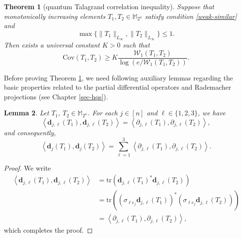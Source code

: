 \documentclass{amsbook}
\newtheorem{theorem}{Theorem}[chapter]
\newtheorem{lemma}[theorem]{Lemma}
\theoremstyle{definition}
\theoremstyle{remark}
\numberwithin{section}{chapter}
\numberwithin{equation}{chapter}
\newcommand{\M}{\mathbb{M}}
\newcommand{\1}{\mathbf{1}}
\newcommand{\dc}{\mathbf{d}}
\begin{document}
\begin{theorem}[quantum Talagrand correlation inequality]\label{quantum-ta}
 Suppose that monotonically increasing elements $T_1,T_2\in \M_{2^{n}}$ satisfy condition \eqref{weak-similar} and $$\max\{\|T_1\|_{L_{\infty}},\|T_2\|_{L_{\infty}}\}\leq 1.$$ Then exists a universal constant $K>0$ such that 
	\begin{equation}
		\mathrm{Cov}(T_1,T_2)\geq K\frac{\mathcal{W}_{1}(T_1,T_2)}{\log\left(e/\mathcal{W}_{1}(T_1,T_2)\right)}.
	\end{equation}
\end{theorem}



Before proving Theorem \ref{quantum-ta}, we need following auxiliary lemmas regarding the basic properties related to the partial differential operators and Rademacher projections (see Chapter \ref{sec-hqs}).

\begin{lemma}\label{monotone-lemma-1}
	Let $T_1$, $T_2\in \M_{2^{n}}$. For each $j\in [n]$ and $\ell\in\{1,2,3\}$, we have
	\begin{equation*}
		\left\langle \dc_{j,\ell}(T_1),\dc_{j,\ell}(T_2)\right\rangle=\left\langle\partial_{j,\ell}(T_1),\partial_{j,\ell}(T_2)\right\rangle,
	\end{equation*}
and consequently,
	\begin{equation}\label{transfer}
		\left\langle \dc_{j}(T_1),\dc_{j}(T_2)\right\rangle=\sum_{\ell=1}^3\left\langle\partial_{j,\ell}(T_1),\partial_{j,\ell}(T_2)\right\rangle.
	\end{equation}
\end{lemma}

\begin{proof}
We write
	\begin{align*}
		\left\langle \dc_{j,\ell}(T_1),\dc_{j,\ell}(T_2)\right\rangle&=\mathrm{tr}\left(\dc_{j,\ell}(T_1)^{*}\dc_{j,\ell}(T_2)\right)\\
		&=\mathrm{tr}\left(\left(\sigma_{\ell e_{j}}\dc_{j, \ell}(T_1)\right)^{*}\left(\sigma_{\ell e_{j}}\dc_{j,\ell}(T_2)\right)\right)\\
		&=\left\langle\partial_{j,\ell}(T_1),\partial_{j,\ell}(T_2)\right\rangle,
	\end{align*}
	which completes the proof.
\end{proof}
\end{document}
